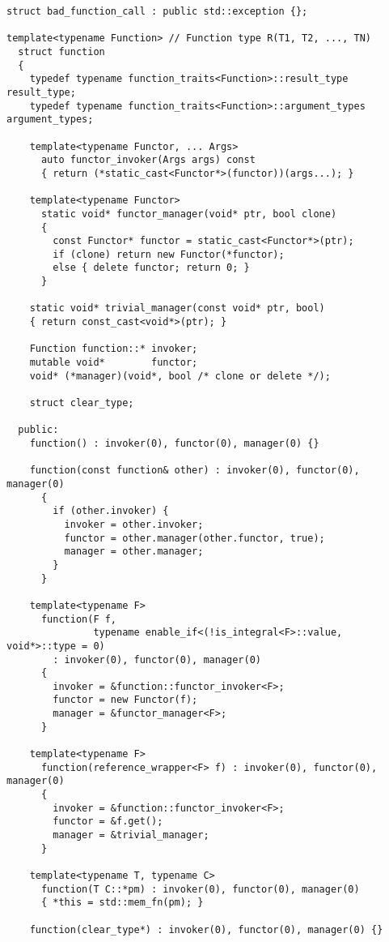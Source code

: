 \documentclass{article}
\begin{document}
\small
\begin{verbatim}
struct bad_function_call : public std::exception {};

template<typename Function> // Function type R(T1, T2, ..., TN)
  struct function
  {
    typedef typename function_traits<Function>::result_type result_type;
    typedef typename function_traits<Function>::argument_types argument_types;

    template<typename Functor, ... Args>
      auto functor_invoker(Args args) const
      { return (*static_cast<Functor*>(functor))(args...); }
    
    template<typename Functor> 
      static void* functor_manager(void* ptr, bool clone)
      { 
        const Functor* functor = static_cast<Functor*>(ptr);
        if (clone) return new Functor(*functor); 
        else { delete functor; return 0; }
      }

    static void* trivial_manager(const void* ptr, bool)
    { return const_cast<void*>(ptr); }

    Function function::* invoker;
    mutable void*        functor;
    void* (*manager)(void*, bool /* clone or delete */);

    struct clear_type;

  public:
    function() : invoker(0), functor(0), manager(0) {}
    
    function(const function& other) : invoker(0), functor(0), manager(0)
      { 
        if (other.invoker) {
          invoker = other.invoker;
          functor = other.manager(other.functor, true);
          manager = other.manager;
        }
      }

    template<typename F> 
      function(F f, 
               typename enable_if<(!is_integral<F>::value, void*>::type = 0) 
        : invoker(0), functor(0), manager(0)
      {
        invoker = &function::functor_invoker<F>;
        functor = new Functor(f);
        manager = &functor_manager<F>;
      }

    template<typename F> 
      function(reference_wrapper<F> f) : invoker(0), functor(0), manager(0)
      { 
        invoker = &function::functor_invoker<F>;
        functor = &f.get();
        manager = &trivial_manager;
      }
    
    template<typename T, typename C> 
      function(T C::*pm) : invoker(0), functor(0), manager(0)
      { *this = std::mem_fn(pm); }

    function(clear_type*) : invoker(0), functor(0), manager(0) {}
    

\end{verbatim}
\end{document}
